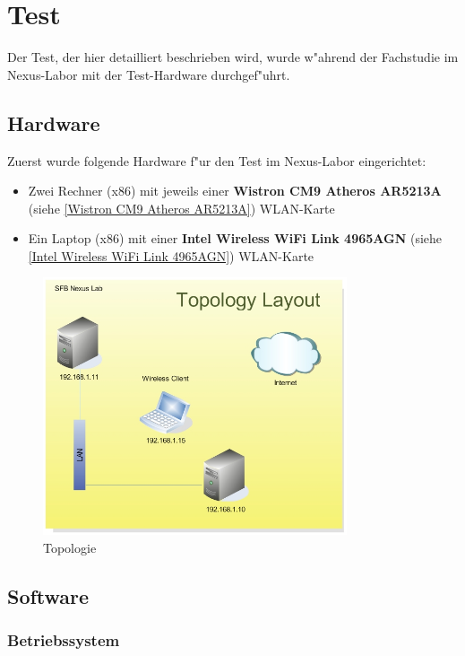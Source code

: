 \section{Test}

Der Test, der hier detailliert beschrieben wird, wurde w"ahrend der Fachstudie
im Nexus-Labor mit der Test-Hardware durchgef"uhrt.

\subsection{Hardware}

Zuerst wurde folgende Hardware f"ur den Test im Nexus-Labor eingerichtet:
\begin{itemize}
\item Zwei Rechner (x86) mit jeweils einer \textbf{Wistron CM9 Atheros AR5213A}
(siehe \ref{Wistron CM9 Atheros AR5213A}) WLAN-Karte
\item Ein Laptop (x86) mit einer \textbf{Intel Wireless WiFi Link 4965AGN}
(siehe \ref{Intel Wireless WiFi Link 4965AGN}) WLAN-Karte
\end{itemize}

\begin{figure}[H]
  \centering
  \includegraphics[width=0.8\textwidth]{images/Labor.jpg}
  \caption{Topologie}
  \label{fig:Topologie}
\end{figure}

\subsection{Software}

\subsubsection{Betriebssystem}

